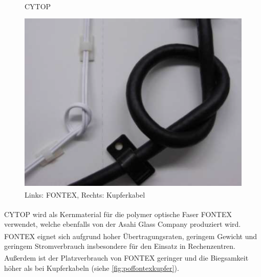 \begin{figure}[H]
    \begin{center}
        \begin{minipage}{0.4\textwidth}
            \begin{center}
                \footnotesize


                \caption{CYTOP\textsuperscript{\texttrademark}}
                \label{rec:cytop}
            \end{center}
        \end{minipage}
        \hspace{0.025\textwidth}
        \begin{minipage}{0.4\textwidth}
            \begin{center}
                \includegraphics[height=0.1275\textheight]{Bilder/Optische_Wellenleiter_Die_Polymer_Optische_Faser/Kernmaterialien/poffontexkupfer.png}
                \caption[Links: FONTEX\textsuperscript{\texttrademark}, Rechts: Kupferkabel\newline              \url{www.lucina.jp/eg_fontex/pdf/Tecnhical.pdf} S.10 (zuletzt aufgerufen am 19.09.2015)]{Links: FONTEX\textsuperscript{\texttrademark}, Rechts: Kupferkabel}
                \label{fig:poffontexkupfer}
            \end{center}
        \end{minipage}
    \end{center}
\end{figure}

CYTOP\textsuperscript{\texttrademark} wird als Kernmaterial für die polymer
optische Faser FONTEX\textsuperscript{\texttrademark} verwendet, welche
ebenfalls von der Asahi Glass Company produziert wird.
FONTEX\textsuperscript{\texttrademark} eignet sich aufgrund hoher
Übertragungsraten, geringem Gewicht und geringem Stromverbrauch insbesondere für
den Einsatz in Rechenzentren. Außerdem ist der Platzverbrauch von
FONTEX\textsuperscript{\texttrademark} geringer und die Biegsamkeit höher als
bei Kupferkabeln (siehe \autoref{fig:poffontexkupfer}). \cite{poffontex}
